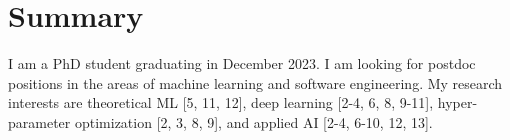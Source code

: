 \section{Summary}

I am a PhD student graduating in December 2023. I am looking for postdoc positions in the areas of machine learning and software engineering. My research interests are theoretical ML [5, 11, 12], deep learning [2-4, 6, 8, 9-11], hyper-parameter optimization [2, 3, 8, 9], and applied AI [2-4, 6-10, 12, 13]. 